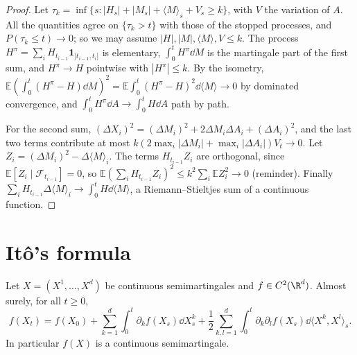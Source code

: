 \begin{proof}
Let $\tau_k=\inf\{s:|H_s|+|M_s|+\langle M\rangle_s+V_s\ge k\}$, with $V$ the variation of $A$. All the quantities agree on $\{\tau_k>t\}$ with those of the stopped processes, and $P(\tau_k\le t)\to0$; so we may assume
$|H|,|M|,\langle M\rangle,V\le k$. The process $H^\pi=\sum_iH_{t_{i-1}}\mathbf 1_{]t_{i-1},t_i]}$ is elementary, $\int_0^tH^\pi\dd M$ is the martingale part of the first sum, and $H^\pi\to H$ pointwise with $|H^\pi|\le k$. By the isometry,
$\mathbb E(\int_0^t(H^\pi-H)\dd M)^2=\mathbb E\int_0^t(H^\pi-H)^2\dd\langle M\rangle\to0$ by dominated convergence, and $\int_0^tH^\pi\dd A\to\int_0^tH\dd A$ path by path.

For the second sum, $(\Delta X_i)^2=(\Delta M_i)^2+2\Delta M_i\Delta A_i+(\Delta A_i)^2$, and the last two terms contribute at most $k(2\max_i|\Delta M_i|+\max_i|\Delta A_i|)V_t\to0$. Let $Z_i=(\Delta M_i)^2-\Delta\langle M\rangle_i$.
The terms $H_{t_{i-1}}Z_i$ are orthogonal, since $\mathbb E[Z_i\mid\mathcal F_{t_{i-1}}]=0$, so $\mathbb E(\sum_iH_{t_{i-1}}Z_i)^2\le k^2\sum_i\mathbb EZ_i^2\to0$ (reminder). Finally
$\sum_iH_{t_{i-1}}\Delta\langle M\rangle_i\to\int_0^tH\dd\langle M\rangle$, a Riemann--Stieltjes sum of a continuous function.
\end{proof}

\section{It\^o's formula}

\begin{theorem}[It\^o's formula, 1951]\label{thm:itoformula}
Let $X=(X^1,\dots,X^d)$ be continuous semimartingales and $f\in C^2(\R^d)$. Almost surely, for all $t\ge0$,
\[
f(X_t)=f(X_0)+\sum_{k=1}^d\int_0^t\partial_kf(X_s)\dd X^k_s+\frac12\sum_{k,l=1}^d\int_0^t\partial_k\partial_lf(X_s)\dd\langle X^k,X^l\rangle_s .
\]
In particular $f(X)$ is a continuous semimartingale.
\end{theorem}

